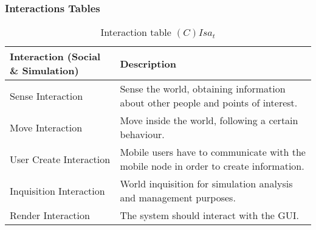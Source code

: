 \subsubsection{Interactions Tables}

\begin{table}[H]
	\centering
	\begin{tabular}{|p{4cm}|p{8cm}|}
			\hline
			\textbf{Interaction (Social \& Simulation)} & \textbf{Description} \\
			\hline
			Sense Interaction & Sense the world, obtaining information about other
			people and points of interest. \\
			\hline
			Move Interaction & Move inside the world, following a certain behaviour.
			\\
			\hline
			User Create Interaction & Mobile users have to communicate with the
			mobile node in order to create information. \\
			\hline
			\hline
			Inquisition Interaction & World inquisition for simulation analysis and
			management purposes. \\
			\hline
			Render Interaction & The system should interact with the GUI. \\
			\hline
		\end{tabular}
	\caption{Interaction table $(C)Isa_t$}
	\label{tab:cisat}
\end{table}


